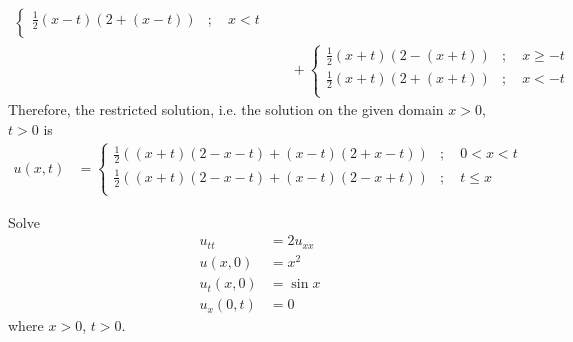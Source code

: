 \documentclass[titlepage, fleqn, a4paper, 12pt, twoside]{article}
\theoremstyle{definition}
\theoremstyle{theorem}
\begin{document}
\begin{solution}
\begin{align*}
\begin{cases}
				\frac{1}{2} (x - t) \left( 2 + (x - t) \right) & ;\quad x < t   \\
			\end{cases}\\
		&\quad +
			\begin{cases}
				\frac{1}{2} (x + t) \left( 2 - (x + t) \right) & ;\quad x \ge -t \\
				\frac{1}{2} (x + t) \left( 2 + (x + t) \right) & ;\quad x < -t   \\
			\end{cases}
	\end{align*}
	Therefore, the restricted solution, i.e. the solution on the given domain $x > 0$, $t > 0$ is
	\begin{align*}
		u(x,t) &=
			\begin{cases}
				\frac{1}{2} \left( (x + t) (2 - x - t) + (x - t) (2 + x - t) \right) & ;\quad 0 < x < t \\
				\frac{1}{2} \left( (x + t) (2 - x - t) + (x - t) (2 - x + t) \right) & ;\quad t \le x   \\
			\end{cases}
	\end{align*}
\end{solution}

\begin{question}
	Solve
	\begin{align*}
		u_{t t}  & = 2 u_{x x} \\
		u(x,0)   & = x^2       \\
		u_t(x,0) & = \sin x    \\
		u_x(0,t) & = 0
	\end{align*}
	where $x > 0$, $t > 0$.
\end{question}
\end{document}
